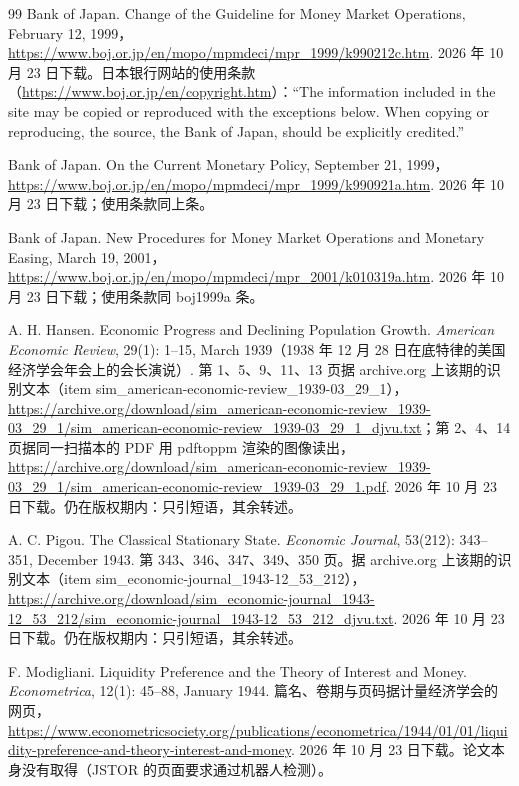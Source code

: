 \begin{thebibliography}{99}
 Bank of Japan. Change of the Guideline for Money Market Operations, February 12, 1999，\url{https://www.boj.or.jp/en/mopo/mpmdeci/mpr_1999/k990212c.htm}. 2026 年 10 月 23 日下载。日本银行网站的使用条款（\url{https://www.boj.or.jp/en/copyright.htm}）：“The information included in the site may be copied or reproduced with the exceptions below. When copying or reproducing, the source, the Bank of Japan, should be explicitly credited.”

 Bank of Japan. On the Current Monetary Policy, September 21, 1999，\url{https://www.boj.or.jp/en/mopo/mpmdeci/mpr_1999/k990921a.htm}. 2026 年 10 月 23 日下载；使用条款同上条。

 Bank of Japan. New Procedures for Money Market Operations and Monetary Easing, March 19, 2001，\url{https://www.boj.or.jp/en/mopo/mpmdeci/mpr_2001/k010319a.htm}. 2026 年 10 月 23 日下载；使用条款同 boj1999a 条。

 A. H. Hansen. Economic Progress and Declining Population Growth. \emph{American Economic Review}, 29(1): 1--15, March 1939（1938 年 12 月 28 日在底特律的美国经济学会年会上的会长演说）. 第 1、5、9、11、13 页据 archive.org 上该期的识别文本（item sim\_american-economic-review\_1939-03\_29\_1），\url{https://archive.org/download/sim_american-economic-review_1939-03_29_1/sim_american-economic-review_1939-03_29_1_djvu.txt}；第 2、4、14 页据同一扫描本的 PDF 用 pdftoppm 渲染的图像读出，\url{https://archive.org/download/sim_american-economic-review_1939-03_29_1/sim_american-economic-review_1939-03_29_1.pdf}. 2026 年 10 月 23 日下载。仍在版权期内：只引短语，其余转述。

 A. C. Pigou. The Classical Stationary State. \emph{Economic Journal}, 53(212): 343--351, December 1943. 第 343、346、347、349、350 页。据 archive.org 上该期的识别文本（item sim\_economic-journal\_1943-12\_53\_212），\url{https://archive.org/download/sim_economic-journal_1943-12_53_212/sim_economic-journal_1943-12_53_212_djvu.txt}. 2026 年 10 月 23 日下载。仍在版权期内：只引短语，其余转述。

 F. Modigliani. Liquidity Preference and the Theory of Interest and Money. \emph{Econometrica}, 12(1): 45--88, January 1944. 篇名、卷期与页码据计量经济学会的网页，\url{https://www.econometricsociety.org/publications/econometrica/1944/01/01/liquidity-preference-and-theory-interest-and-money}. 2026 年 10 月 23 日下载。论文本身没有取得（JSTOR 的页面要求通过机器人检测）。


\end{thebibliography}
